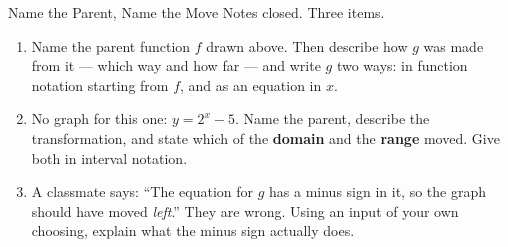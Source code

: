 \documentclass[10pt]{article}
\begin{document}

\vspace{0.15in}

\begin{notesbox}{Name the Parent, Name the Move}
\small
Notes closed. Three items.

\begin{center}
\end{center}

\begin{enumerate}[leftmargin=1.6em, itemsep=8pt, topsep=4pt]

\item Name the parent function $f$ drawn above. Then describe how $g$ was made from it --- which
way and how far --- and write $g$ two ways: in function notation starting from $f$, and as an
equation in $x$.


\item No graph for this one: $y=2^x-5$. Name the parent, describe the transformation, and state
which of the \textbf{domain} and the \textbf{range} moved. Give both in interval notation.


\item A classmate says: ``The equation for $g$ has a minus sign in it, so the graph should have
moved \emph{left}.'' They are wrong. Using an input of your own choosing, explain what the minus
sign actually does.


\end{enumerate}
\end{notesbox}
\end{document}
